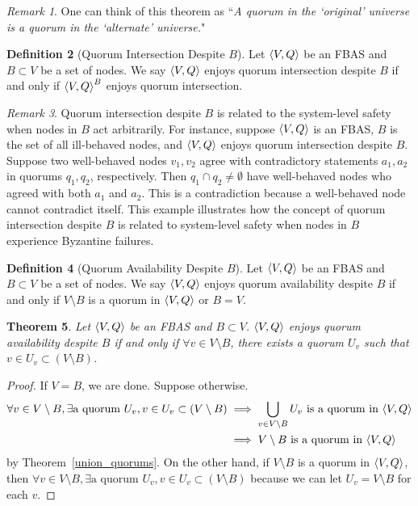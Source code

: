 \documentclass[12pt, psamsfonts]{amsart}
\newtheorem{thm}{Theorem}[subsection]
\theoremstyle{definition}
\newtheorem{defn}[thm]{Definition}
\theoremstyle{remark}
\newtheorem{rem}[thm]{Remark}
\numberwithin{equation}{subsection}
\begin{document}
\begin{rem}
    One can think of this theorem as ``\textit{A quorum in the `original' universe is a quorum in the `alternate' universe.}"
\end{rem}

\begin{defn}[Quorum Intersection Despite $B$]
    Let $\ev{V, Q}$ be an FBAS and $B \subset V$ be a set of nodes.
    We say $\ev{V, Q}$ enjoys quorum intersection despite $B$ if and only if $\ev{V, Q}^B$ enjoys quorum intersection.
\end{defn}

\begin{rem}
    Quorum intersection despite $B$ is related to the system-level safety when nodes in $B$ act arbitrarily.
    For instance, suppose $\ev{V, Q}$ is an FBAS, $B$ is the set of all ill-behaved nodes, and $\ev{V, Q}$ enjoys quorum intersection despite $B$.
    Suppose two well-behaved nodes $v_1, v_2$ agree with contradictory statements $a_1, a_2$ in quorums $q_1, q_2$, respectively.
    Then $q_1 \cap q_2 \ne \emptyset$ have well-behaved nodes who agreed with both $a_1$ and $a_2$.
    This is a contradiction because a well-behaved node cannot contradict itself.
    This example illustrates how the concept of quorum intersection despite $B$ is related to system-level safety when nodes in $B$ experience Byzantine failures.
\end{rem}

\begin{defn}[Quorum Availability Despite $B$]\label{def_quorum_availability}
    Let $\ev{V, Q}$ be an FBAS and $B \subset V$ be a set of nodes.
    We say $\ev{V, Q}$ enjoys quorum availability despite $B$ if and only if $V \setminus B$ is a quorum in $\ev{V, Q}$ or $B = V$.
\end{defn}

\begin{thm}\label{quorum_availability_equivalence_condition}
    Let $\ev{V, Q}$ be an FBAS and $B \subset V$.
    $\ev{V, Q}$ enjoys quorum availability despite $B$ if and only if $\forall v \in V \setminus B$, there exists a quorum $U_v$ such that $v \in U_v \subset (V \setminus B)$.
\end{thm}

\begin{proof}
    If $V = B$, we are done.
    Suppose otherwise.
    \begin{align*}
        \forall v \in V \setminus B, \exists \text{a quorum $U_v$}, v \in U_v \subset (V \setminus B)
            &\implies \bigcup_{v \in V \setminus B} U_v \text{ is a quorum in $\ev{V, Q}$} \\
            &\implies \text{$V \setminus B$ is a quorum in $\ev{V, Q}$}
    \end{align*}
    by Theorem~\ref{union_quorums}.
    On the other hand, if $V \setminus B$ is a quorum in $\ev{V, Q}$, then $\forall v \in V \setminus B, \exists \text{a quorum $U_v$}, v \in U_v \subset (V \setminus B)$ because we can let $U_v = V \setminus B$ for each $v$.
\end{proof}
\end{document}

